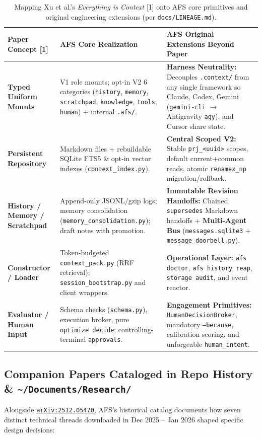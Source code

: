 \documentclass[10pt,letterpaper]{article}
\newcommand{\code}[1]{\texttt{\color{InkNavy}#1}}
\newcommand{\home}{\code{\textasciitilde}}
\newcommand{\arxiv}[1]{\href{https://arxiv.org/abs/#1}{\code{arXiv:#1}}}
\begin{document}
\begin{table}[ht!]
\centering
\sffamily\footnotesize
\begin{tabularx}{\textwidth}{@{}>{\raggedright\bfseries\arraybackslash}p{3.0cm} >{\raggedright\arraybackslash}p{5.8cm} >{\raggedright\arraybackslash}X@{}}
\toprule
\color{InkNavy}Paper Concept [1] & \color{InkNavy}AFS Core Realization & \color{InkNavy}AFS Original Extensions Beyond Paper \\
\midrule
Typed Uniform Mounts &
V1 role mounts; opt-in V2 6 categories (\code{history}, \code{memory}, \code{scratchpad}, \code{knowledge}, \code{tools}, \code{human}) + internal \code{.afs/}. &
\textbf{Harness Neutrality:} Decouples \code{.context/} from any single framework so Claude, Codex, Gemini (\code{gemini-cli} $\rightarrow$ Antigravity \code{agy}), and Cursor share state. \\
\addlinespace[2.5pt]
Persistent Repository &
Markdown files + rebuildable SQLite FTS5 \& opt-in vector indexes (\code{context\_index.py}). &
\textbf{Central Scoped V2:} Stable \code{prj\_<uuid>} scopes, default current+common reads, atomic \code{renamex\_np} migration/rollback. \\
\addlinespace[2.5pt]
History / Memory / Scratchpad &
Append-only JSONL/gzip logs; memory consolidation (\code{memory\_consolidation.py}); draft notes with promotion. &
\textbf{Immutable Revision Handoffs:} Chained \code{supersedes} Markdown handoffs + \textbf{Multi-Agent Bus} (\code{messages.sqlite3} + \code{message\_doorbell.py}). \\
\addlinespace[2.5pt]
Constructor / Loader &
Token-budgeted \code{context\_pack.py} (RRF retrieval); \code{session\_bootstrap.py} and client wrappers. &
\textbf{Operational Layer:} \code{afs doctor}, \code{afs history reap}, \code{storage audit}, and event reactor. \\
\addlinespace[2.5pt]
Evaluator / Human Input &
Schema checks (\code{schema.py}), execution broker, pure \code{optimize decide}; controlling-terminal \code{approvals}. &
\textbf{Engagement Primitives:} \code{HumanDecisionBroker}, mandatory \code{--because}, calibration scoring, and unforgeable \code{human\_intent}. \\
\bottomrule
\end{tabularx}
\caption{Mapping Xu et al.'s \emph{Everything is Context} [1] onto AFS core primitives and original engineering extensions (per \code{docs/LINEAGE.md}).}
\label{tab:xu_map}
\end{table}

\subsection{\texorpdfstring{Companion Papers Cataloged in Repo History \& \home\code{/Documents/Research/}}{Companion Papers Cataloged in Repo History and ~/Documents/Research/}}
Alongside \arxiv{2512.05470}, AFS's historical catalog documents how seven distinct technical threads downloaded in Dec 2025 -- Jan 2026 shaped specific design decisions:
\end{document}
